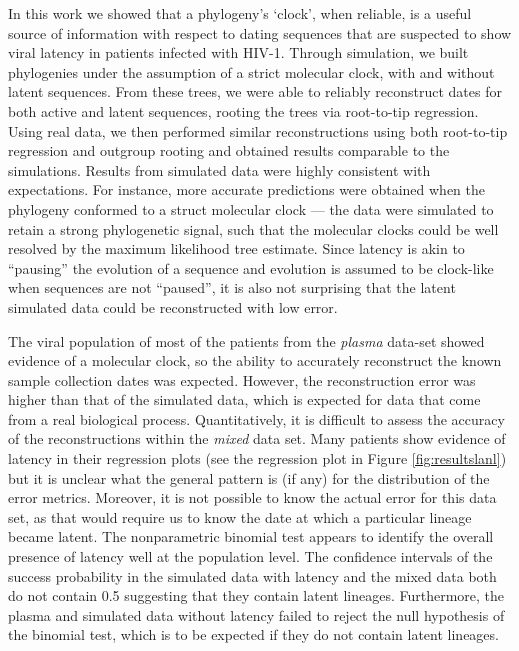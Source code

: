 \documentclass[12pt]{article}
\begin{document}
In this work we showed that a phylogeny's `clock', when reliable, is a useful source of information with respect to dating sequences that are suspected to show viral latency in patients infected with HIV-1. 
Through simulation, we built phylogenies under the assumption of a strict molecular clock, with and without latent sequences.
From these trees, we were able to reliably reconstruct dates for both active and latent sequences, rooting the trees via root-to-tip regression.
Using real data, we then performed similar reconstructions using both root-to-tip regression and outgroup rooting and obtained results comparable to the simulations.
Results from simulated data were highly consistent with expectations. 
For instance, more accurate predictions were obtained when the phylogeny conformed to a struct molecular clock --- the data were simulated to retain a strong phylogenetic signal, such that the molecular clocks could be well resolved by the maximum likelihood tree estimate. 
Since latency is akin to ``pausing'' the evolution of a sequence and evolution is assumed to be clock-like when sequences are not ``paused'', it is also not surprising that the latent simulated data could be reconstructed with low error. 

The viral population of most of the patients from the {\em plasma} data-set showed evidence of a molecular clock, so the ability to accurately reconstruct the known sample collection dates was expected.
However, the reconstruction error was higher than that of the simulated data, which is expected for data that come from a real biological process.
Quantitatively, it is difficult to assess the accuracy of the reconstructions within the {\em mixed} data set. 
Many patients show evidence of latency in their regression plots (see the regression plot in Figure \ref{fig:resultslanl}) but it is unclear what the general pattern is (if any) for the distribution of the error metrics. 
Moreover, it is not possible to know the actual error for this data set, as that would require us to know the date at which a particular lineage became latent. 
The nonparametric binomial test appears to identify the overall presence of latency well at the population level.
The confidence intervals of the success probability in the simulated data with latency and the mixed data both do not contain 0.5 suggesting that they contain latent lineages.
Furthermore, the plasma and simulated data without latency failed to reject the null hypothesis of the binomial test, which is to be expected if they do not contain latent lineages.
\end{document}
